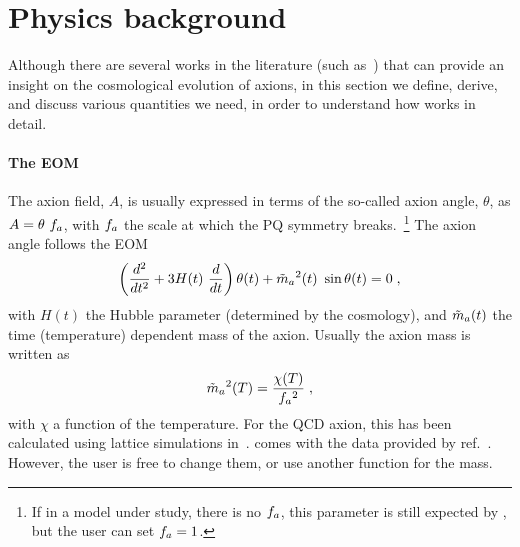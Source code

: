 \documentclass[11pt,a4paper]{article}
\begin{document}
\section{Physics background}\label{sec:Physics}
\setcounter{equation}{0}
%
Although there are several works in the literature (such as~\cite{Chang:1998ys,MARSH20161}) that can provide an insight on the cosmological evolution of axions, in this section we define, derive, and discuss various quantities we need, in order to understand how \mimes works in detail.

\paragraph{The EOM} 
%
The axion field, $A$, is usually expressed in terms of the so-called axion angle, $\theta$, as $A = \theta \ f_{a}{}$, with $f_{a}{}$ the scale at which the PQ symmetry breaks.~\footnote{If in a model under study, there is no $f_{a}{}$, this parameter is still expected by \mimes, but the user can set $f_{a}{}=1$.} 
%
The axion angle follows the EOM 
%
\begin{equation}
	\lrb{\dfrac{d^2}{d t^2} + 3 H(t) \ \dfrac{d}{d t} } \theta(t) + \maT^2(t) \ \sin \theta(t) = 0 \; ,
	\label{eq:eom}
\end{equation}
%
with $H(t)$ the Hubble parameter (determined by the cosmology), and $\tilde m_{a}{}(t)$  the time (temperature) dependent mass of the axion. Usually the axion mass is written as
%
\begin{equation}
	\tilde m_{a}{}^2(T) = \dfrac{\chi(T)}{f_{a}{}^2}\;,
	\label{eq:axion_mass_def}
\end{equation} 
%
with $\chi$ a function of the temperature. For the QCD axion, this has been calculated using lattice simulations in~\cite{Borsanyi:2016ksw}. \mimes comes with the data provided by ref.~\cite{Borsanyi:2016ksw}. However, the user is free to change them, or use another function for the mass.
\end{document}
